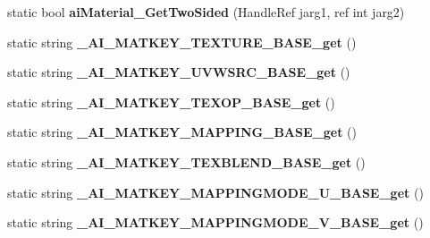 \begin{DoxyCompactItemize}
\item 
\hypertarget{class_assimp_p_i_n_v_o_k_e_ab591283b5da766a1be2207197303fc67}{static bool {\bfseries ai\+Material\+\_\+\+Get\+Two\+Sided} (Handle\+Ref jarg1, ref int jarg2)}\label{class_assimp_p_i_n_v_o_k_e_ab591283b5da766a1be2207197303fc67}

\item 
\hypertarget{class_assimp_p_i_n_v_o_k_e_a5b25c2324a04e8694504d4cb3ce3a324}{static string {\bfseries \+\_\+\+A\+I\+\_\+\+M\+A\+T\+K\+E\+Y\+\_\+\+T\+E\+X\+T\+U\+R\+E\+\_\+\+B\+A\+S\+E\+\_\+get} ()}\label{class_assimp_p_i_n_v_o_k_e_a5b25c2324a04e8694504d4cb3ce3a324}

\item 
\hypertarget{class_assimp_p_i_n_v_o_k_e_a84ab88555a17475ff5d82fa64f419efd}{static string {\bfseries \+\_\+\+A\+I\+\_\+\+M\+A\+T\+K\+E\+Y\+\_\+\+U\+V\+W\+S\+R\+C\+\_\+\+B\+A\+S\+E\+\_\+get} ()}\label{class_assimp_p_i_n_v_o_k_e_a84ab88555a17475ff5d82fa64f419efd}

\item 
\hypertarget{class_assimp_p_i_n_v_o_k_e_a376ca940b4d103b9333f7702fb7c3ac6}{static string {\bfseries \+\_\+\+A\+I\+\_\+\+M\+A\+T\+K\+E\+Y\+\_\+\+T\+E\+X\+O\+P\+\_\+\+B\+A\+S\+E\+\_\+get} ()}\label{class_assimp_p_i_n_v_o_k_e_a376ca940b4d103b9333f7702fb7c3ac6}

\item 
\hypertarget{class_assimp_p_i_n_v_o_k_e_a35458cfd4e55254628685de7193626fe}{static string {\bfseries \+\_\+\+A\+I\+\_\+\+M\+A\+T\+K\+E\+Y\+\_\+\+M\+A\+P\+P\+I\+N\+G\+\_\+\+B\+A\+S\+E\+\_\+get} ()}\label{class_assimp_p_i_n_v_o_k_e_a35458cfd4e55254628685de7193626fe}

\item 
\hypertarget{class_assimp_p_i_n_v_o_k_e_aefd3a1f39473dadccd75c66c0e1983aa}{static string {\bfseries \+\_\+\+A\+I\+\_\+\+M\+A\+T\+K\+E\+Y\+\_\+\+T\+E\+X\+B\+L\+E\+N\+D\+\_\+\+B\+A\+S\+E\+\_\+get} ()}\label{class_assimp_p_i_n_v_o_k_e_aefd3a1f39473dadccd75c66c0e1983aa}

\item 
\hypertarget{class_assimp_p_i_n_v_o_k_e_a9ed5b3c88d00c3836d39df6682ec9ed3}{static string {\bfseries \+\_\+\+A\+I\+\_\+\+M\+A\+T\+K\+E\+Y\+\_\+\+M\+A\+P\+P\+I\+N\+G\+M\+O\+D\+E\+\_\+\+U\+\_\+\+B\+A\+S\+E\+\_\+get} ()}\label{class_assimp_p_i_n_v_o_k_e_a9ed5b3c88d00c3836d39df6682ec9ed3}

\item 
\hypertarget{class_assimp_p_i_n_v_o_k_e_a7b7ba88748db17a1c91fb87aee65a26d}{static string {\bfseries \+\_\+\+A\+I\+\_\+\+M\+A\+T\+K\+E\+Y\+\_\+\+M\+A\+P\+P\+I\+N\+G\+M\+O\+D\+E\+\_\+\+V\+\_\+\+B\+A\+S\+E\+\_\+get} ()}\label{class_assimp_p_i_n_v_o_k_e_a7b7ba88748db17a1c91fb87aee65a26d}


\end{DoxyCompactItemize}
